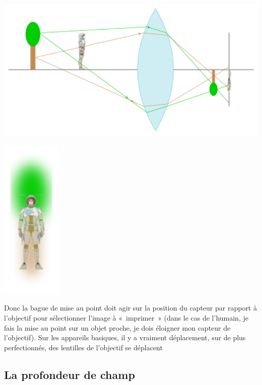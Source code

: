 \documentclass[../../main/main.tex]{subfiles}
\begin{document}
\begin{minipage}[c]{0.53\linewidth}
	\begin{center}
		\includegraphics[width=\linewidth]{mise_pt-b}
	\end{center}
\end{minipage}
\hfill
\begin{minipage}[c]{0.45\linewidth}
	\begin{center}
		\includegraphics[scale=.8]{mise_pt-res}
	\end{center}
\end{minipage}

Donc la bague de mise au point doit agir sur la position du capteur par rapport
à l'objectif pour sélectionner l'image à «~imprimer~» (dans le cas de l'humain,
je fais la mise au point sur un objet proche, je dois éloigner mon capteur de
l'objectif). Sur les appareils basiques, il y a vraiment déplacement, sur de
plus perfectionnés, des lentilles de l'objectif se déplacent

\subsection{La profondeur de champ}
\end{document}
